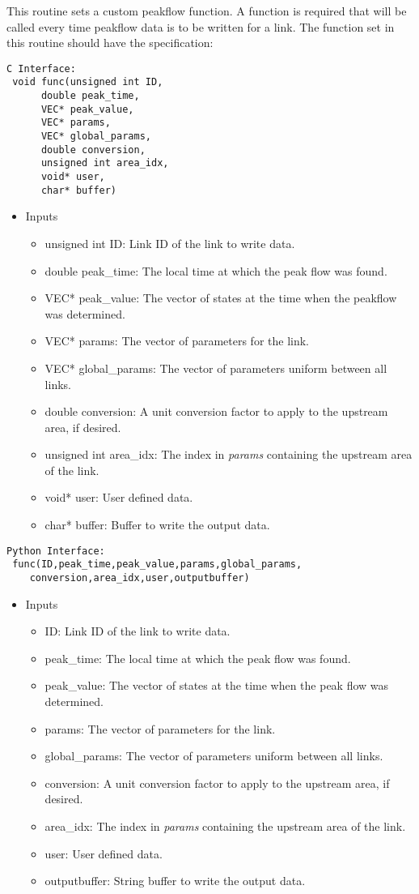 \documentclass[12pt]{article}
\begin{document}
This routine sets a custom peakflow function. A function is required that will be called every time peakflow data is to be written for a link. The function set in this routine should have the specification:
\begin{lstlisting}[style=CStyle]
 C Interface:
 void func(unsigned int ID,
      double peak_time,
      VEC* peak_value,
      VEC* params,
      VEC* global_params,
      double conversion,
      unsigned int area_idx,
      void* user,
      char* buffer)
\end{lstlisting}
\begin{itemize}
 \item Inputs
  \begin{itemize}
   \item unsigned int ID: Link ID of the link to write data.
   \item double peak\_time: The local time at which the peak flow was found.
   \item VEC* peak\_value: The vector of states at the time when the peakflow was determined.
   \item VEC* params: The vector of parameters for the link.
   \item VEC* global\_params: The vector of parameters uniform between all links.
   \item double conversion: A unit conversion factor to apply to the upstream area, if desired.
   \item unsigned int area\_idx: The index in \emph{params} containing the upstream area of the link.
   \item void* user: User defined data.
   \item char* buffer: Buffer to write the output data.
  \end{itemize}
\end{itemize}
\begin{lstlisting}[style=PythonStyle]
 Python Interface:
 func(ID,peak_time,peak_value,params,global_params,
	conversion,area_idx,user,outputbuffer)
\end{lstlisting}
\begin{itemize}
 \item Inputs
  \begin{itemize}
   \item ID: Link ID of the link to write data.
   \item peak\_time: The local time at which the peak flow was found.
   \item peak\_value: The vector of states at the time when the peak flow was determined.
   \item params: The vector of parameters for the link.
   \item global\_params: The vector of parameters uniform between all links.
   \item conversion: A unit conversion factor to apply to the upstream area, if desired.
   \item area\_idx: The index in \emph{params} containing the upstream area of the link.
   \item user: User defined data.
   \item outputbuffer: String buffer to write the output data.
  \end{itemize}
\end{itemize}
\end{document}
